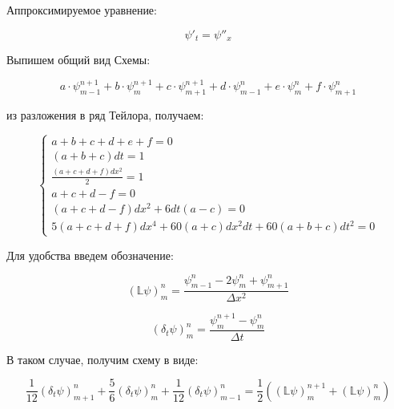 \documentclass[10pt,a4paper]{article}
\begin{document}
	Аппроксимируемое уравнение:
	
	\begin{equation}
		\psi'_{t} = \psi''_{x}
	\end{equation}
	
	Выпишем общий вид Схемы:
	
	\begin{equation}
		a\cdot\psi_{m - 1}^{n + 1} + b\cdot\psi_{m}^{n + 1} + c\cdot\psi_{m + 1}
		^{n + 1} + d\cdot\psi^{n}_{m - 1} + e\cdot\psi^{n}_{m} + f\cdot
		\psi^{n}_{m + 1}
	\end{equation}
	
	из разложения в ряд Тейлора, получаем:
	
	\begin{equation}
		\begin{cases}
			a + b + c + d + e + f = 0
			\\
			\left(a + b + c\right)dt = 1
			\\
			\frac{\left(a + c + d + f\right)dx^{2}}{2} = 1
			\\
			a + c + d - f = 0
			\\
			\left(a + c + d - f\right)dx^{2} + 6dt\left(a - c\right) = 0
			\\
			5\left(a + c + d + f\right)dx^{4} + 60\left(a + c\right)dx^{2}dt + 
			60\left(a + b + c\right)dt^{2} = 0
		\end{cases}
	\end{equation}
	
	Для удобства введем обозначение:
	
	\begin{equation}
		\left(\mathbb{L}\psi\right)^{n}_{m} = \frac{\psi^{n}_{m - 1} - 2\psi^{n}
		_{m} + \psi^{n}_{m + 1}}{\Delta x^{2}}
	\end{equation}
	
	\begin{equation}
		\left(\delta_{t}\psi\right)_{m}^{n} = \frac{\psi^{n + 1}_{m} - \psi_{m}
		^{n}}{\Delta t}
	\end{equation}
	
	В таком случае, получим схему в виде:
	
	\begin{equation}
		\frac{1}{12}\left(\delta_{t}\psi\right)_{m + 1}^{n} + 
		\frac{5}{6}\left(\delta_{t}\psi\right)_{m}^{n} + 
		\frac{1}{12}\left(\delta_{t}\psi\right)_{m - 1}^{n} = 
		\frac{1}{2}\left(\left(\mathbb{L}\psi\right)^{n + 1}_{m} + 
		\left(\mathbb{L}\psi\right)^{n}_{m}\right)
	\end{equation}
\end{document}
